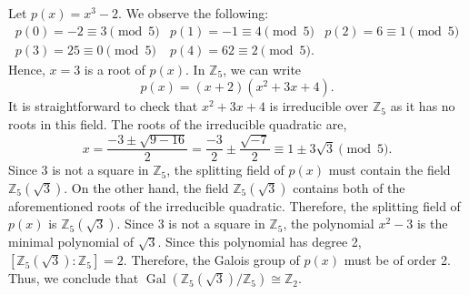 \documentclass{article}
\begin{document}
\begin{solutions}
	Let $p(x)= x^{3} - 2$. We observe the following:
		\begin{equation}
			\begin{matrix}
				p(0) = -2 \equiv 3 \pmod{5} & p(1) = -1 \equiv 4 \pmod{5} & p(2) = 6 \equiv 1 \pmod{5} \\
				p(3) = 25 \equiv 0 \pmod{5} & p(4) = 62 \equiv 2 \pmod{5}.
			\end{matrix}
		\end{equation}
	Hence, $x = 3$ is a root of $p(x)$. In $\mathbb{Z}_{5}$, we can write 
		\begin{equation}
			p(x) = (x + 2)(x^{2} + 3x + 4). 
		\end{equation}
	It is straightforward to check that $x^{2} + 3x + 4$ is irreducible over $\mathbb{Z}_{5}$ as it has no roots in this field. The roots of the irreducible quadratic are, 
		\begin{equation}
			x = \frac{-3 \pm \sqrt{9 - 16}}{2} = \frac{-3}{2} \pm \frac{\sqrt{-7}}{2} \equiv 1 \pm 3\sqrt{3} \pmod{5}. 
		\end{equation}
	Since $3$ is not a square in $\mathbb{Z}_{5}$, the splitting field of $p(x)$ must contain the field $\mathbb{Z}_{5}(\sqrt{3})$. On the other hand, the field $\mathbb{Z}_{5}(\sqrt{3})$ contains both of the aforementioned roots of the irreducible quadratic. Therefore, the splitting field of $p(x)$ is $\mathbb{Z}_{5}(\sqrt{3})$. Since $3$ is not a square in $\mathbb{Z}_{5}$, the polynomial $x^{2} - 3$ is the minimal polynomial of $\sqrt{3}$. Since this polynomial has degree 2, $[\mathbb{Z}_{5}(\sqrt{3}): \mathbb{Z}_{5}] = 2$. Therefore, the Galois group of $p(x)$ must be of order 2. Thus, we conclude that $\operatorname{Gal}(\mathbb{Z}_{5}(\sqrt{3})/\mathbb{Z}_{5}) \cong \mathbb{Z}_{2}$. 
\end{solutions}
\end{document}
